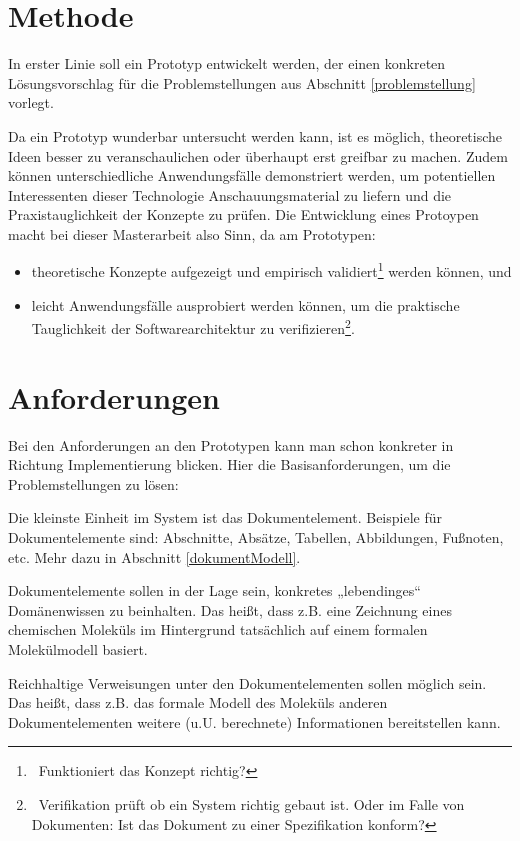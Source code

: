  
\section{Methode}\label{}
 
In erster Linie soll ein Prototyp entwickelt werden, der einen konkreten Lösungsvorschlag für die Problemstellungen aus Abschnitt \ref{problemstellung} vorlegt.

 
Da ein Prototyp wunderbar untersucht werden kann, ist es möglich, theoretische Ideen besser zu veranschaulichen oder überhaupt erst greifbar zu machen. Zudem können unterschiedliche Anwendungsfälle demonstriert werden, um potentiellen Interessenten dieser Technologie Anschauungsmaterial zu liefern und die Praxistauglichkeit der Konzepte zu prüfen. Die Entwicklung eines Protoypen macht bei dieser Masterarbeit also Sinn, da am Prototypen:

 
\begin{itemize}

\item theoretische Konzepte aufgezeigt und empirisch validiert\footnote{~Funktioniert das Konzept richtig?} werden können, und
\item leicht Anwendungsfälle ausprobiert werden können, um die praktische Tauglichkeit der Softwarearchitektur zu verifizieren\footnote{~Verifikation prüft ob ein System richtig gebaut ist. Oder im Falle von Dokumenten: Ist das Dokument zu einer Spezifikation konform?}.
\end{itemize}
 
\section{Anforderungen}\label{anforderungen-sec}
 
Bei den Anforderungen an den Prototypen kann man schon konkreter in Richtung Implementierung blicken. Hier die Basisanforderungen, um die Problemstellungen zu lösen:

 
Die kleinste Einheit im System ist das Dokumentelement. Beispiele für Dokumentelemente sind: Abschnitte, Absätze, Tabellen, Abbildungen, Fußnoten, etc. Mehr dazu in Abschnitt \ref{dokumentModell}.

 
Dokumentelemente sollen in der Lage sein, konkretes „lebendinges“ Domänenwissen zu beinhalten. Das heißt, dass z.B. eine Zeichnung eines chemischen Moleküls im Hintergrund tatsächlich auf einem formalen Molekülmodell basiert.

 
Reichhaltige Verweisungen unter den Dokumentelementen sollen möglich sein. Das heißt, dass z.B. das formale Modell des Moleküls anderen Dokumentelementen weitere (u.U. berechnete) Informationen bereitstellen kann.

